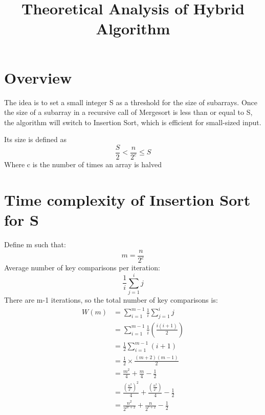 \documentclass[10pt, a4paper]{article}
\title{Theoretical Analysis of Hybrid Algorithm}
\begin{document}

\section{Overview}
The idea is to set a small integer S as a threshold for the size of subarrays. Once the size of a subarray in a recursive call of Mergesort is less than or equal to S, the algorithm will switch to Insertion Sort, which is efficient for small-sized input. 

\vspace{10pt}

Its size is defined as
\[ \frac{S}{2} < \frac{n}{2^c} \leq S\]
Where c is the number of times an array is halved

\section{Time complexity of Insertion Sort for S}
Define m such that:
\[ m = \frac{n}{2^c} \]
Average number of key comparisons per iteration:
\[ \frac{1}{i} \sum_{j=1}^{i}j \]
There are m-1 iterations, so the total number of key comparisons is:
\begin{equation*}
\begin{split}
W(m) & =\sum_{i=1}^{m-1} \frac{1}{i} \sum_{j=1}^{i}j \\
& = \sum_{i=1}^{m-1} \frac{1}{i} (\frac{i(i+1)}{2}) \\
& = \frac{1}{2} \sum_{i=1}^{m-1}(i+1) \\
& = \frac{1}{2} \times \frac{(m+2)(m-1)}{2} \\
& = \frac{m^2}{4} + \frac{m}{4} - \frac{1}{2} \\
& = \frac{(\frac{n^2}{2^c})^2}{4} + \frac{(\frac{n^2}{2^c})}{4} - \frac{1}{2} \\
& = \frac{n^2}{2^{2c+2}} + \frac{n}{2^{c+2}} - \frac{1}{2}
\end{split}
\end{equation*}
\end{document}
